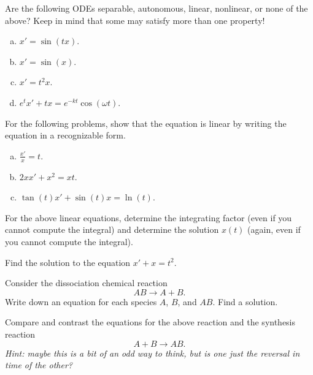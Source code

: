 \begin{problem}
Are the following ODEs separable, autonomous, linear, nonlinear, or none of the above? Keep in mind that some may satisfy more than one property!
    \begin{enumerate}[(a)]
        \item $x' = \sin(tx)$.
        \item $x' = \sin(x)$.
        \item $x' = t^2 x$.
        \item $e^t x' + tx = e^{-k t} \cos(\omega t).$
    \end{enumerate}
\end{problem}

\begin{problem}
For the following problems, show that the equation is linear by writing the equation in a recognizable form.
    \begin{enumerate}[(a)]
        \item $\frac{x'}{x} = t$.
        \item $2xx'+x^2=xt$.
        \item $\tan(t) x' + \sin(t) x = \ln(t).$
    \end{enumerate}
\end{problem}

\begin{problem}
    For the above linear equations, determine the integrating factor (even if you cannot compute the integral) and determine the solution $x(t)$ (again, even if you cannot compute the integral).
\end{problem}

\begin{problem}
    Find the solution to the equation $x'+x=t^2$.
\end{problem}

\begin{problem}
    Consider the dissociation chemical reaction
    \[
        AB \to A + B.
    \]
    Write down an equation for each species $A$, $B$, and $AB$.  Find a solution.
\end{problem}

\begin{problem}
    Compare and contrast the equations for the above reaction and the synthesis reaction
    \[
        A+B \to AB.
    \]
    \emph{Hint: maybe this is a bit of an odd way to think, but is one just the reversal in time of the other?}
\end{problem}

